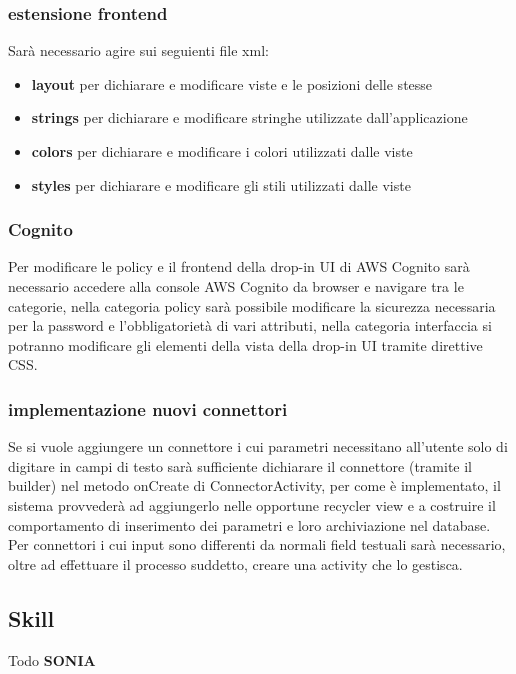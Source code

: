 \subsubsection{estensione frontend}
Sarà necessario agire sui seguienti file xml:
\begin{itemize}
\item \textbf{layout} per dichiarare e modificare viste e le posizioni delle stesse
\item \textbf{strings} per dichiarare e modificare stringhe utilizzate dall'applicazione
\item \textbf{colors} per dichiarare e modificare i colori utilizzati dalle viste
\item \textbf{styles} per dichiarare e modificare gli stili utilizzati dalle viste
\end{itemize}

\subsubsection{Cognito}
Per modificare le policy e il frontend della drop-in UI di AWS Cognito sarà necessario accedere alla console AWS Cognito da browser e navigare tra le categorie, nella categoria policy sarà possibile modificare la sicurezza necessaria per la password e l'obbligatorietà di vari attributi, nella categoria interfaccia si potranno modificare gli elementi della vista della drop-in UI tramite direttive CSS.

\subsubsection{implementazione nuovi connettori}
Se si vuole aggiungere un connettore i cui parametri necessitano all'utente solo di digitare in campi di testo sarà sufficiente dichiarare il connettore (tramite il builder) nel metodo onCreate di ConnectorActivity, per come è implementato, il sistema provvederà ad aggiungerlo nelle opportune recycler view e a costruire il comportamento di inserimento dei parametri e loro archiviazione nel database.
Per connettori i cui input sono differenti da normali field testuali sarà necessario, oltre ad effettuare il processo suddetto, creare una activity che lo gestisca.





\subsection{Skill}

Todo \textbf{SONIA}
